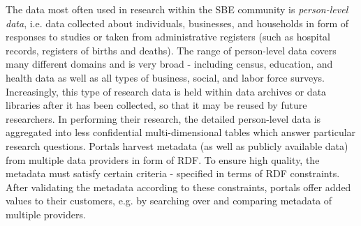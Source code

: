 \documentclass{llncs}
\begin{document}
The data most often used in research within the SBE community is \emph{person-level data}, i.e. data collected about individuals, businesses, and households in form of responses to studies or taken from administrative registers
(such as hospital records, registers of births and deaths). 
The range of person-level data covers many different domains and is very broad - 
including census, education, and health data as well as all types of business, social, and labor force surveys.  
Increasingly, this type of research data is
held within data archives or data libraries after it has been collected, so that it may be
reused by future researchers. 
In performing their research, the detailed person-level
data is aggregated into less confidential multi-dimensional tables which answer particular research questions.
Portals harvest metadata (as well as publicly available data) from multiple data providers in form of RDF.
To ensure high quality, the metadata must satisfy certain criteria - specified in terms of RDF constraints.  
After validating the metadata according to these constraints, portals offer added values to their customers, e.g. by searching over and comparing metadata of multiple providers. 
\end{document}
